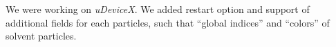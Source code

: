 We were working on \textit{uDeviceX}. We added restart option and
support of additional fields for each particles, such that ``global indices'' and ``colors'' of solvent particles.
